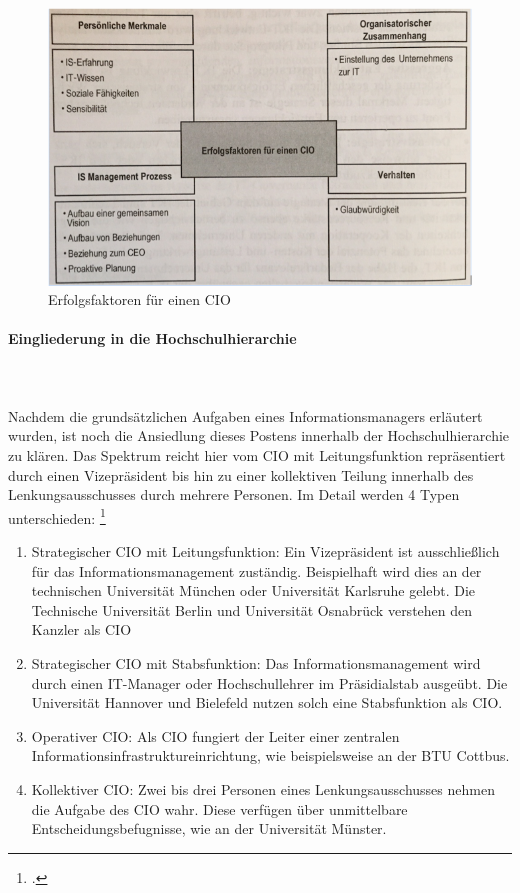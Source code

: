 \begin{figure}[h!]
	\centering
	\includegraphics[width=15cm]{kapitel/gruppe1_2/bilder/erfolgsfaktoren_cio} 
	\caption{Erfolgsfaktoren für einen CIO\protect\footnotemark}
	\label{efec}
\end{figure}

\paragraph{Eingliederung in die Hochschulhierarchie}\mbox{}\\\\
Nachdem die grundsätzlichen Aufgaben eines Informationsmanagers erläutert wurden, ist noch die Ansiedlung dieses Postens innerhalb der Hochschulhierarchie zu klären. Das Spektrum reicht hier vom CIO mit Leitungsfunktion repräsentiert durch einen Vizepräsident bis hin zu einer kollektiven Teilung innerhalb des Lenkungsausschusses durch mehrere Personen. Im Detail werden 4 Typen unterschieden: \footcite[Vgl.][10]{leitner_itil_2008}

\begin{enumerate}
	\item Strategischer CIO mit Leitungsfunktion: Ein Vizepräsident ist ausschließlich für das Informationsmanagement zuständig. Beispielhaft wird dies an der technischen Universität München oder Universität Karlsruhe gelebt. Die Technische Universität Berlin und Universität Osnabrück verstehen den Kanzler als CIO
	\item Strategischer CIO mit Stabsfunktion: Das Informationsmanagement wird durch einen IT-Manager oder Hochschullehrer im Präsidialstab ausgeübt. Die Universität Hannover und Bielefeld nutzen solch eine Stabsfunktion als CIO.
	\item Operativer CIO: Als CIO fungiert der Leiter einer zentralen Informationsinfrastruktureinrichtung, wie beispielsweise an der BTU Cottbus.
	\item Kollektiver CIO: Zwei bis drei Personen eines Lenkungsausschusses nehmen die Aufgabe des CIO wahr. Diese verfügen über unmittelbare Entscheidungsbefugnisse, wie an der Universität Münster.
\end{enumerate}


